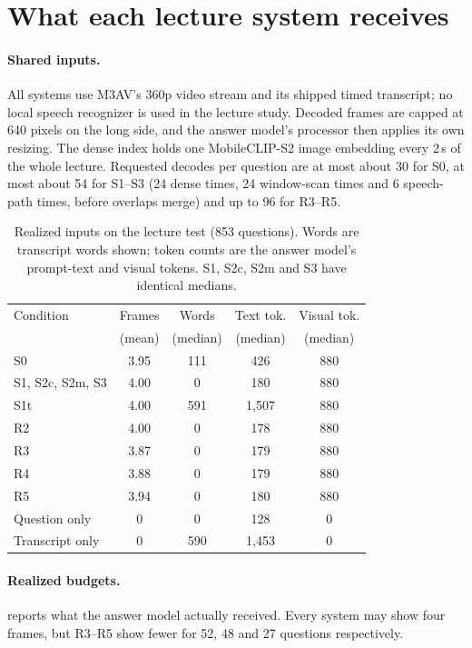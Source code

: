 \section{What each lecture system receives}
\label{sec:s-systems}

\paragraph{Shared inputs.}
All systems use M3AV's 360p video stream and its shipped timed transcript; no local speech recognizer is used in the lecture study.
Decoded frames are capped at 640 pixels on the long side, and the answer model's processor then applies its own resizing.
The dense index holds one MobileCLIP-S2 image embedding every 2\,s of the whole lecture.
Requested decodes per question are at most about 30 for S0, at most about 54 for S1--S3 (24 dense times, 24 window-scan times and 6 speech-path times, before overlaps merge) and up to 96 for R3--R5.

\begin{table}[t]
\centering
\small
\setlength{\tabcolsep}{3.5pt}
\begin{tabular}{@{}lcccc@{}}
\toprule
Condition & Frames & Words & Text tok. & Visual tok. \\
 & (mean) & (median) & (median) & (median) \\
\midrule
S0 & 3.95 & 111 & 426 & 880 \\
S1, S2c, S2m, S3 & 4.00 & 0 & 180 & 880 \\
S1t & 4.00 & 591 & 1,507 & 880 \\
R2 & 4.00 & 0 & 178 & 880 \\
R3 & 3.87 & 0 & 179 & 880 \\
R4 & 3.88 & 0 & 179 & 880 \\
R5 & 3.94 & 0 & 180 & 880 \\
Question only & 0 & 0 & 128 & 0 \\
Transcript only & 0 & 590 & 1,453 & 0 \\
\bottomrule
\end{tabular}
\caption{Realized inputs on the lecture test (853 questions). Words are transcript words shown; token counts are the answer model's prompt-text and visual tokens. S1, S2c, S2m and S3 have identical medians.}
\label{tab:s-inputs}
\end{table}

\paragraph{Realized budgets.}
 reports what the answer model actually received.
Every system may show four frames, but R3--R5 show fewer for 52, 48 and 27 questions respectively.

